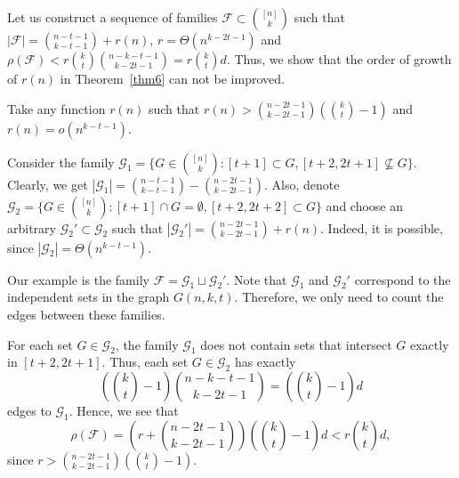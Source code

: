 \documentclass[12pt,a4paper]{article}
\newcommand{\ff}{\mathcal{F}}
\newcommand{\cG}{\mathcal{G}}
\begin{document}
Let us construct a sequence of families $\ff \subset \binom{[n]}{k}$ such that $|\ff| = \binom{n-t-1}{k-t-1} + r(n)$, $r = \Theta(n^{k-2t-1})$ and $\rho(\ff) < r\binom{k}{t}\binom{n-k-t-1}{k-2t-1}=r\binom{k}{t}d$. Thus, we show that the order of growth of $r(n)$ in Theorem~\ref{thm6} can not be improved.

Take any function $r(n)$ such that $r(n) > \binom{n-2t-1}{k-2t-1}\left(\binom{k}{t} - 1\right)$ and $r(n) = o(n^{k-t-1})$.


Consider the family $\cG_1 = \{G \in \binom{[n]}{k} : [t+1] \subset G, [t+2, 2t+1] \nsubseteq G \}$. Clearly, we get $|\cG_1| = \binom{n-t-1}{k-t-1} - \binom{n-2t-1}{k-2t-1}$. Also, denote $\cG_2 = \{G \in \binom{[n]}{k} : [t+1] \cap G = \emptyset, [t+2, 2t+2] \subset G \}$ and choose an arbitrary $\cG_2' \subset \cG_2$ such that $|\cG_2'| = \binom{n-2t-1}{k-2t-1} + r(n)$. Indeed, it is possible, since $|\cG_2| = \Theta(n^{k-t-1})$.

Our example is the family $\ff = \cG_1 \sqcup \cG_2'$. Note that $\cG_1$ and $\cG_2'$ correspond to the independent sets in the graph $G(n,k,t)$. Therefore, we only need to count the edges between these families.

For each set $G \in \cG_2$, the family $\cG_1$ does not contain sets that intersect $G$ exactly in $[t+2,2t+1]$. Thus, each set $G \in \cG_2$ has exactly $$\left(\binom{k}{t} - 1\right)\binom{n-k-t-1}{k-2t-1} = \left(\binom{k}{t} - 1\right)d$$
edges to $\cG_1$. Hence, we see that
$$\rho(\ff) = \left(r + \binom{n-2t-1}{k-2t-1}\right)\left(\binom{k}{t} - 1\right)d < r\binom{k}{t}d,$$
since $r > \binom{n-2t-1}{k-2t-1}\left(\binom{k}{t} - 1\right)$.


\end{document}
